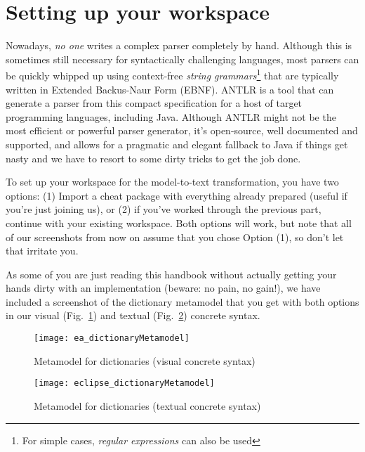 \newpage
\section{Setting up your workspace}
\genHeader

Nowadays, \emph{no one} writes a complex parser completely by hand. Although this is sometimes still necessary for syntactically challenging languages, most
parsers can be quickly whipped up using context-free \emph{string grammars}\footnote{For simple cases, \emph{regular expressions} can also be used} that are
typically written in Extended Backus-Naur Form (EBNF). ANTLR is a tool that can generate a parser from this compact specification for
a host of target programming languages, including Java. Although ANTLR might not be the most efficient or powerful parser generator, it's open-source, well
documented and supported, and allows for a pragmatic and elegant fallback to Java if things get nasty and we have to resort to some dirty tricks to get the job
done.

To set up your workspace for the model-to-text transformation, you have two options: (1) Import a cheat package with everything already
prepared (useful if you're just joining us), or (2) if you've worked through the previous part, continue with your existing
workspace. Both options will work, but note that all of our screenshots from now on assume that you chose Option (1), so don't let that irritate you.

As some of you are just reading this handbook without actually getting your hands dirty with an implementation (beware: no pain, no gain!), we have included a
screenshot of the dictionary metamodel that you get with both options in our visual (Fig.~\ref{ea:dictLang}) and textual (Fig.~\ref{eclipse:dictLangMetamodel})
concrete syntax.

\vspace{0.5cm}

\begin{figure}[htbp]
  \hspace{-1.5cm}
  \texttt{[image: ea\_dictionaryMetamodel]}
  \caption{Metamodel for dictionaries (visual concrete syntax)}
  \label{ea:dictLang}
\end{figure}

\newpage

\begin{figure}[h!]
  \hspace{-1.5cm}
  \texttt{[image: eclipse\_dictionaryMetamodel]}
  \caption{Metamodel for dictionaries (textual concrete syntax)}
  \label{eclipse:dictLangMetamodel}
\end{figure}

